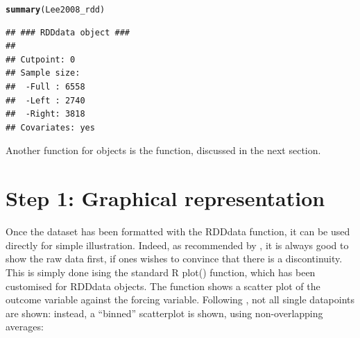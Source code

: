 \documentclass[english,nojss]{jss}\usepackage{graphicx, color}
\makeatletter
\newcommand{\hlfunctioncall}[1]{\textcolor[rgb]{0.501960784313725,0,0.329411764705882}{\textbf{#1}}}%
\newenvironment{kframe}{%
 \def\at@end@of@kframe{}%
 \ifinner\ifhmode%
  \def\at@end@of@kframe{\end{minipage}}%
  \begin{minipage}{\columnwidth}%
 \fi\fi%
 \def\FrameCommand##1{\hskip\@totalleftmargin \hskip-\fboxsep
 \colorbox{shadecolor}{##1}\hskip-\fboxsep
     \hskip-\linewidth \hskip-\@totalleftmargin \hskip\columnwidth}%
 \MakeFramed {\advance\hsize-\width
   \@totalleftmargin\z@ \linewidth\hsize
   \@setminipage}}%
 {\par\unskip\endMakeFramed%
 \at@end@of@kframe}
\newenvironment{knitrout}{}{} %
\makeatother
\begin{document}
\begin{knitrout}
\color{fgcolor}\begin{kframe}
\begin{alltt}
\hlfunctioncall{summary}(Lee2008_rdd)
\end{alltt}
\begin{verbatim}
## ### RDDdata object ###
## 
## Cutpoint: 0 
## Sample size: 
## 	-Full : 6558 
## 	-Left : 2740 
## 	-Right: 3818
## Covariates: yes
\end{verbatim}
\end{kframe}
\end{knitrout}


Another function for  objects is the 
function, discussed in the next section. 


\section{Step 1: Graphical representation}


Once the dataset has been formatted with the RDDdata function, it
can be used directly for simple illustration. Indeed, as recommended
by \citet{LeeLemieux2010}, it is always good to show the raw data
first, if ones wishes to convince that there is a discontinuity. This
is simply done ising the standard R plot() function, which has been
customised for RDDdata objects. The function shows a scatter plot
of the outcome variable against the forcing variable. Following \citet{LeeLemieux2010},
not all single datapoints are shown: instead, a ``binned'' scatterplot
is shown, using non-overlapping averages:
\end{document}
